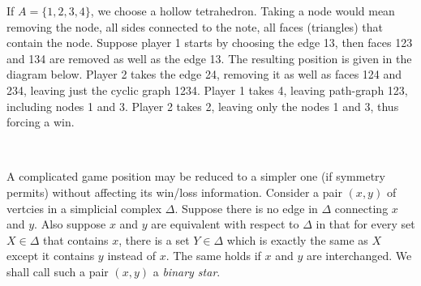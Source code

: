 \documentclass[a4paper, 12pt]{article}
\theoremstyle{remark} %
\begin{document}
If $A=\{1,2,3,4\}$, we choose a hollow tetrahedron. Taking a node would mean removing the node, all sides connected to the note, all faces (triangles) that contain the node. Suppose player 1 starts by choosing the edge 13, then faces 123 and 134 are removed as well as the edge 13. The resulting position is given in the diagram below. Player 2 takes the edge 24, removing it as well as faces 124 and 234, leaving just the cyclic graph 1234. Player 1 takes 4, leaving path-graph 123, including nodes 1 and 3. Player 2 takes 2, leaving only the nodes 1 and 3, thus forcing a win.\\

\begin{center}
\\
\end{center}

A complicated game position may be reduced to a simpler one (if symmetry permits) without affecting its win/loss information. Consider a pair $(x,y)$ of vertcies in a simplicial complex $\Delta$. Suppose there is no edge in $\Delta$ connecting $x$ and $y$. Also suppose $x$ and $y$ are equivalent with respect to $\Delta$ in that for every set $X \in \Delta$ that contains $x$, there is a set $Y \in \Delta$ which is exactly the same as $X$ except it contains $y$ instead of $x$. The same holds if $x$ and $y$ are interchanged. We shall call such a pair $(x,y)$ a \textit{binary star}.
\end{document}
